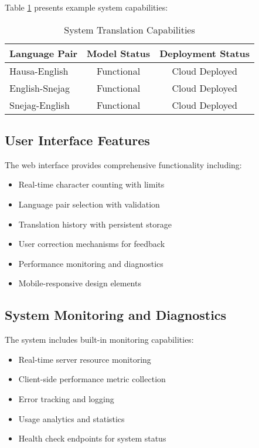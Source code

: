 \documentclass[conference]{IEEEtran}
\begin{document}
Table \ref{tab:translation-examples} presents example system capabilities:

\begin{table}[htbp]
\centering
\caption{System Translation Capabilities}
\label{tab:translation-examples}
\begin{tabular}{@{}lcc@{}}
\toprule
Language Pair & Model Status & Deployment Status \\
\midrule
Hausa-English & Functional & Cloud Deployed \\
English-Snejag & Functional & Cloud Deployed \\
Snejag-English & Functional & Cloud Deployed \\
\bottomrule
\end{tabular}
\end{table}

\subsection{User Interface Features}

The web interface provides comprehensive functionality including:
\begin{itemize}
    \item Real-time character counting with limits
    \item Language pair selection with validation
    \item Translation history with persistent storage
    \item User correction mechanisms for feedback
    \item Performance monitoring and diagnostics
    \item Mobile-responsive design elements
\end{itemize}

\subsection{System Monitoring and Diagnostics}

The system includes built-in monitoring capabilities:
\begin{itemize}
    \item Real-time server resource monitoring
    \item Client-side performance metric collection
    \item Error tracking and logging
    \item Usage analytics and statistics
    \item Health check endpoints for system status
\end{itemize}
\end{document}
